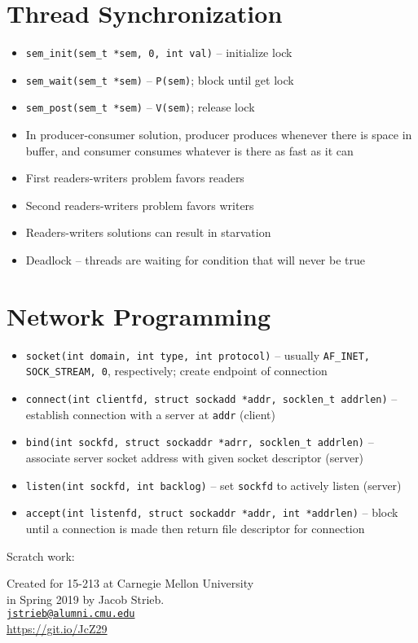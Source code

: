 \documentclass[twocolumn]{article}
\renewcommand{\tt}[1]{\texttt{#1}}
\begin{document}
\section{Thread Synchronization}
\begin{itemize}[noitemsep]
    \item \tt{sem\_init(sem\_t *sem, 0, int val)} -- initialize lock
    \item \tt{sem\_wait(sem\_t *sem)} -- \tt{P(sem)}; block until get lock
    \item \tt{sem\_post(sem\_t *sem)} -- \tt{V(sem)}; release lock
    \item In producer-consumer solution, producer produces whenever there is space in buffer, and consumer consumes whatever is there as fast as it can
    \item First readers-writers problem favors readers
    \item Second readers-writers problem favors writers
    \item Readers-writers solutions can result in starvation
    \item Deadlock -- threads are waiting for condition that will never be true
\end{itemize}

\section{Network Programming}
\begin{itemize}[noitemsep]
    \item \tt{socket(int domain, int type, int protocol)} -- usually \tt{AF\_INET, SOCK\_STREAM, 0}, respectively; create endpoint of connection
    \item \tt{connect(int clientfd, struct sockadd *addr, socklen\_t addrlen)} -- establish connection with a server at \tt{addr} (client)
    \item \tt{bind(int sockfd, struct sockaddr *adrr, socklen\_t addrlen)} -- associate server socket address with given socket descriptor (server)
    \item \tt{listen(int sockfd, int backlog)} -- set \tt{sockfd} to actively listen (server)
    \item \tt{accept(int listenfd, struct sockaddr *addr, int *addrlen)} -- block until a connection is made then return file descriptor for connection
\end{itemize}

\vfill

Scratch work:

\vfill

\begin{center}
  Created for 15-213 at Carnegie Mellon University \\
  in Spring 2019 by Jacob Strieb. \\
  \href{mailto:jstrieb@alumni.cmu.edu}{\tt{jstrieb@alumni.cmu.edu}} \\
  \url{https://git.io/JcZ29}
\end{center}
\end{document}
